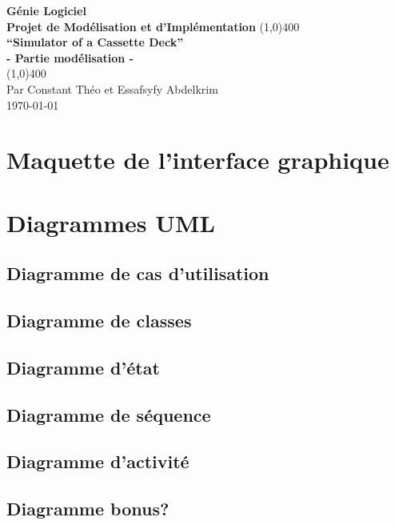 \documentclass[11pt]{article}
\begin{document}
\begin{titlepage}
\begin{center}
\vspace*{1cm}
\Large{\textbf{Génie Logiciel}}\\
\Large{\textbf{Projet de Modélisation et d’Implémentation}}
\vfill
\line(1,0){400}\\[1mm]
\huge{\textbf{“Simulator of a Cassette Deck”}}\\[3mm]
\Large{\textbf{- Partie modélisation -}}\\[1mm]
\line(1,0){400}\\
\vfill
Par Constant Théo et Essafsyfy Abdelkrim\\
\today
\end{center}
\end{titlepage}

\tableofcontents
\thispagestyle{empty} %
\clearpage %

\setcounter{page}{1} %

\section{Maquette de l'interface graphique}
\section{Diagrammes UML}
\subsection{Diagramme de cas d'utilisation}
\subsection{Diagramme de classes}
\subsection{Diagramme d'état}
\subsection{Diagramme de séquence}
\subsection{Diagramme d'activité}
\subsection{Diagramme bonus?}
\end{document}
